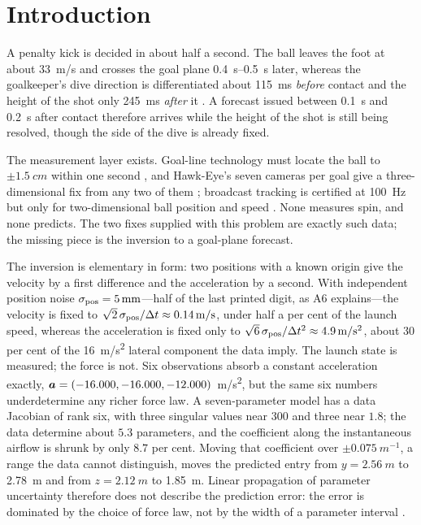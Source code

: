 \section{Introduction}
\label{sec:intro}

A penalty kick is decided in about half a second. The ball leaves the foot at
about \SI{33}{m/s} and crosses the goal plane \SIrange{0.4}{0.5}{s} later, whereas
the goalkeeper's dive direction is differentiated about \SI{115}{ms}
\emph{before} contact and the height of the shot only \SI{245}{ms} \emph{after}
it \citep{higueras2020}. A forecast issued between \SI{0.1}{s} and \SI{0.2}{s}
after contact therefore arrives while the height of the shot is still being
resolved, though the side of the dive is already fixed.

The measurement layer exists. Goal-line technology must locate the ball to
$\pm\SI{1.5}{cm}$ within one second \citep{fifa2020glt}, and Hawk-Eye's seven
cameras per goal give a three-dimensional fix from any two of them
\citep{hawkeye_glt}; broadcast tracking is certified at \SI{100}{Hz} but only
for two-dimensional ball position and speed \citep{fifa2025epts}. None
measures spin, and none predicts. The two fixes supplied with this problem are exactly such data; the
missing piece is the inversion to a goal-plane forecast.

The inversion is elementary in form: two positions with a known origin give
the velocity by a first difference and the acceleration by a second. With
independent position noise $\sigma_{\rm pos}=\SI{5}{mm}$---half of the last
printed digit, as A6 explains---the velocity is fixed to
$\sqrt2\,\sigma_{\rm pos}/\Delta t\approx\SI{0.14}{m/s}$, under half a per
cent of the launch speed, whereas the acceleration is fixed only to
$\sqrt6\,\sigma_{\rm pos}/\Delta t^2\approx\SI{4.9}{m/s^2}$, about 30 per
cent of the \SI{16}{m/s^2} lateral component the data imply. The launch state
is measured; the force is not. Six observations absorb a constant acceleration
exactly, $\bm{a}=(-16.000,-16.000,-12.000)$~\si{m/s^2}, but the same six
numbers underdetermine any richer force law. A seven-parameter model has a data Jacobian of rank six,
with three singular values near $300$ and three near $1.8$; the data determine
about $5.3$ parameters, and the coefficient along the instantaneous airflow is
shrunk by only $8.7$ per cent. Moving that coefficient over
$\pm\SI{0.075}{m^{-1}}$, a range the data cannot distinguish, moves the
predicted entry from $y=\SI{2.56}{m}$ to \SI{2.78}{m} and from
$z=\SI{2.12}{m}$ to \SI{1.85}{m}. Linear propagation of parameter uncertainty
therefore does not describe the prediction error: the error is dominated by
the choice of force law, not by the width of a parameter interval
\citep{gutenkunst2007,white2017}.

